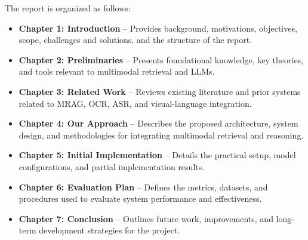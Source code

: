 The report is organized as follows:

\begin{itemize}
    \item \textbf{Chapter 1: Introduction} – Provides background, motivations, objectives, scope, challenges and solutions, and the structure of the report.
    \item \textbf{Chapter 2: Preliminaries} – Presents foundational knowledge, key theories, and tools relevant to multimodal retrieval and LLMs.
    \item \textbf{Chapter 3: Related Work} – Reviews existing literature and prior systems related to MRAG, OCR, ASR, and visual-language integration.
    \item \textbf{Chapter 4: Our Approach} – Describes the proposed architecture, system design, and methodologies for integrating multimodal retrieval and reasoning.
    \item \textbf{Chapter 5: Initial Implementation} – Details the practical setup, model configurations, and partial implementation results.
    \item \textbf{Chapter 6: Evaluation Plan} – Defines the metrics, datasets, and procedures used to evaluate system performance and effectiveness.
    \item \textbf{Chapter 7: Conclusion} – Outlines future work, improvements, and long-term development strategies for the project.
\end{itemize}

\newpage

